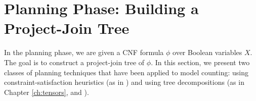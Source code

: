 \section{Planning Phase: Building a Project-Join Tree}
\label{sec_planning}

In the planning phase, we are given a CNF formula $\phi$ over Boolean variables $X$.
The goal is to construct a project-join tree of $\phi$.
In this section, we present two classes of planning techniques that have been applied to model counting:
using constraint-satisfaction heuristics (as in \cite{DPV20}) and using tree decompositions (as in Chapter \ref{ch:tensors}, and \cite{CW16,FHMW17,FHWZ18,FHZ19,fichte2020exploiting}).






